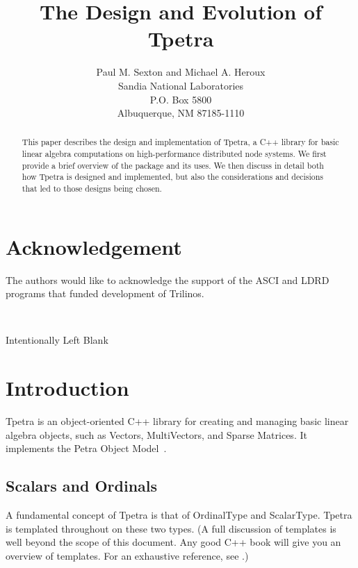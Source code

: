 \documentclass[10pt,relax]{TpetraDesign}
\title{The Design and Evolution of Tpetra}
\author{Paul M. Sexton and Michael A. Heroux \\
       Sandia National Laboratories\\
       P.O. Box 5800\\
       Albuquerque, NM 87185-1110
     }
\date{}
\begin{document}
\maketitle

\begin{abstract}
This paper describes the design and implementation of Tpetra,
a C++ library for basic linear algebra computations on high-performance
distributed node systems. We first provide a brief overview of
the package and its uses. We then discuss in detail both how
Tpetra is designed and implemented, but also the considerations
and decisions that led to those designs being chosen.
\end{abstract}

\clearpage
\section*{Acknowledgement}
The authors would like to acknowledge the support of the ASCI and LDRD programs
that funded development of Trilinos.

\clearpage
\tableofcontents

\newpage
\
\vspace{3.5in}
\begin{center}Intentionally Left Blank\end{center}

\newpage

%
\section{Introduction}

Tpetra is an object-oriented C++ library for creating and managing basic linear algebra objects, such as Vectors, MultiVectors, and Sparse Matrices. It implements the Petra Object Model~\cite{Petra-Object-Model}.

%
\subsection{Scalars and Ordinals}
A fundamental concept of Tpetra is that of OrdinalType and ScalarType. Tpetra is templated throughout on these two types. (A full discussion of templates is well beyond the scope of this document. Any good C++ book will give you an overview of templates. For an exhaustive reference, see \cite{Templates-Complete-Guide}.)
\end{document}
